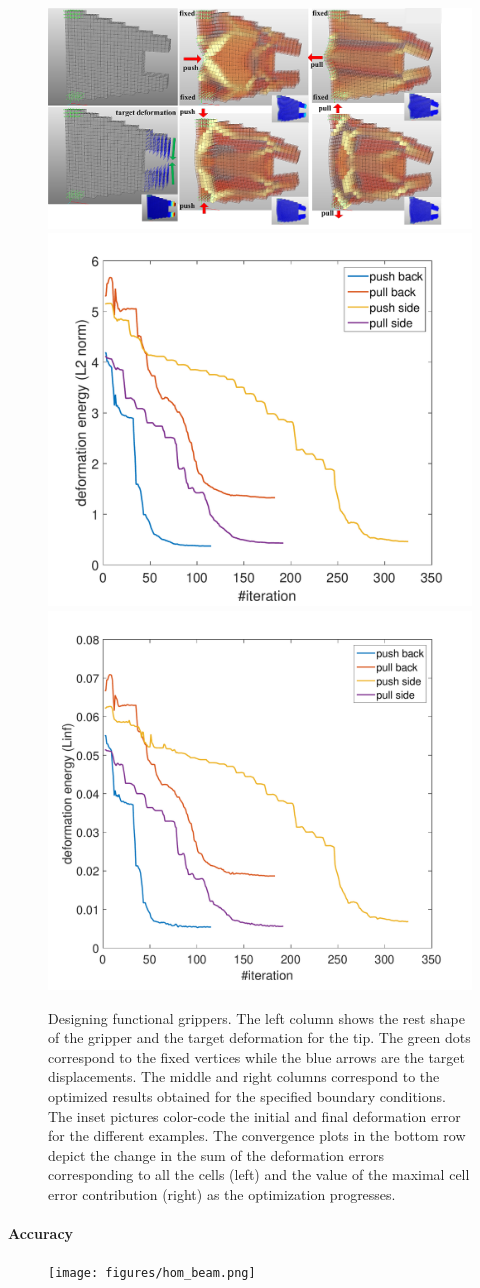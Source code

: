 \begin{figure}[t]
	\centering
	\includegraphics[width=0.9\linewidth]{images/gripperVar.png}
	\includegraphics[width=0.4\linewidth]{images/gripper4_L2.pdf}
	\includegraphics[width=0.4\linewidth]{images/gripper4_Linf.pdf}
	\caption{Designing functional grippers. The left column shows the rest shape of the gripper and the target deformation for the tip.
	The green dots correspond to the fixed vertices while the blue arrows are the target displacements.
	The middle and right columns correspond to the optimized results obtained for the specified boundary conditions.
	The inset pictures color-code the initial and final deformation error for the different examples.
	The convergence plots in the bottom row depict the change in the sum of the deformation errors corresponding to all the cells (left) and the value of the maximal cell error contribution (right) as the optimization progresses.}  
	\label{fig:gripper}
\end{figure}
\paragraph{Accuracy}
\begin{figure}
	\centering
	\texttt{[image: figures/hom\_beam.png]}	
	\caption{
		\label{fig:hom_beam}}
\end{figure}

